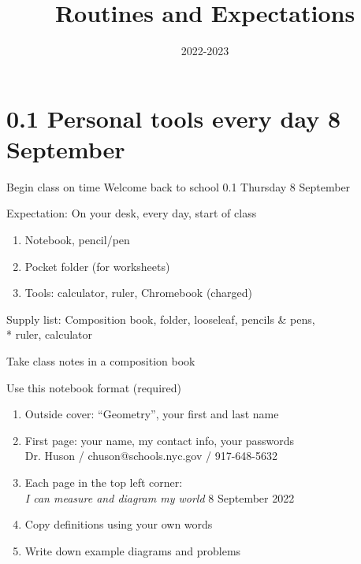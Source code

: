\documentclass[onlytextwidth]{beamer}
\title{Routines and Expectations}
\date{2022-2023}
\begin{document}
\frame{\titlepage}


\section{0.1 Personal tools every day \hfill 8 September}
\begin{frame}{Begin class on time}
  {Welcome back to school \hfill \alert{0.1 Thursday 8 September}}
  \begin{block}{Expectation: On your desk, every day, start of class}
  \begin{enumerate}
      \item Notebook, pencil/pen
      \item Pocket folder (for worksheets)
      \item Tools: calculator, ruler, Chromebook (charged)
  \end{enumerate}
  \end{block}
  Supply list: Composition book, folder, looseleaf, pencils \& pens, \\*
  ruler, calculator
  \end{frame}

\begin{frame}{Take class notes in a composition book}
  \begin{block}{Use this notebook format (required)}
    \begin{enumerate}
      \item Outside cover: ``Geometry'', your first and last name
      \item First page: your name, my contact info, your passwords \\
      \qquad Dr. Huson / chuson@schools.nyc.gov / 917-648-5632 \vspace{0.25cm}
      \item Each page in the top left corner: \\
      \emph{I can measure and diagram my world} \hfill 8 September 2022 \vspace{0.25cm}
      \item Copy definitions using your own words
      \item Write down example diagrams and problems
    \end{enumerate}
    \end{block}
  \end{frame}
\end{document}

